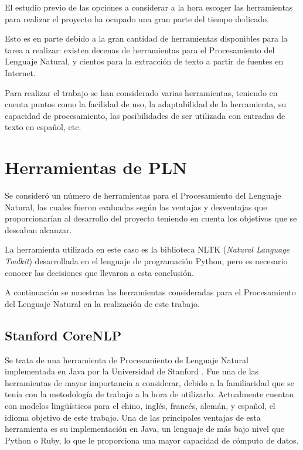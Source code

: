 El estudio previo de las opciones a considerar a la hora escoger las herramientas para realizar el proyecto ha ocupado una gran parte del tiempo dedicado.

Esto es en parte debido a la gran cantidad de herramientas disponibles para la tarea a realizar: existen decenas de herramientas para el Procesamiento del Lenguaje Natural, y cientos para la extracción de texto a partir de fuentes en Internet.

Para realizar el trabajo se han considerado varias herramientas, teniendo en cuenta puntos como la facilidad de uso, la adaptabilidad de la herramienta, su capacidad de procesamiento, las posibilidades de ser utilizada con entradas de texto en español, etc.

\section{Herramientas de PLN}

Se consideró un número de herramientas para el Procesamiento del Lenguaje Natural, las cuales fueron evaluadas según las ventajas y desventajas que proporcionarían al desarrollo del proyecto teniendo en cuenta los objetivos que se deseaban alcanzar.

La herramienta utilizada en este caso es la biblioteca NLTK (\textit{Natural Language Toolkit}) desarrollada en el lenguaje de programación Python, pero es necesario conocer las decisiones que llevaron a esta conclusión.

A continuación se muestran las herramientas consideradas para el Procesamiento del Lenguaje Natural en la realización de este trabajo.

\subsection{Stanford CoreNLP}

Se trata de una herramienta de Procesamiento de Lenguaje Natural implementada en Java por la Universidad de Stanford \cite{stanford-corenlp-paper}.
%
%
Fue una de las herramientas de mayor importancia a considerar, debido a la familiaridad que se tenía con la metodología de trabajo a la hora de utilizarlo.
%
Actualmente cuentan con modelos lingüísticos para el chino, inglés, francés, alemán, y español, el idioma objetivo de este trabajo.
%
Una de las principales ventajas de esta herramienta es su implementación en Java, un lenguaje de más bajo nivel que Python o Ruby, lo que le proporciona una mayor capacidad de cómputo de datos.

